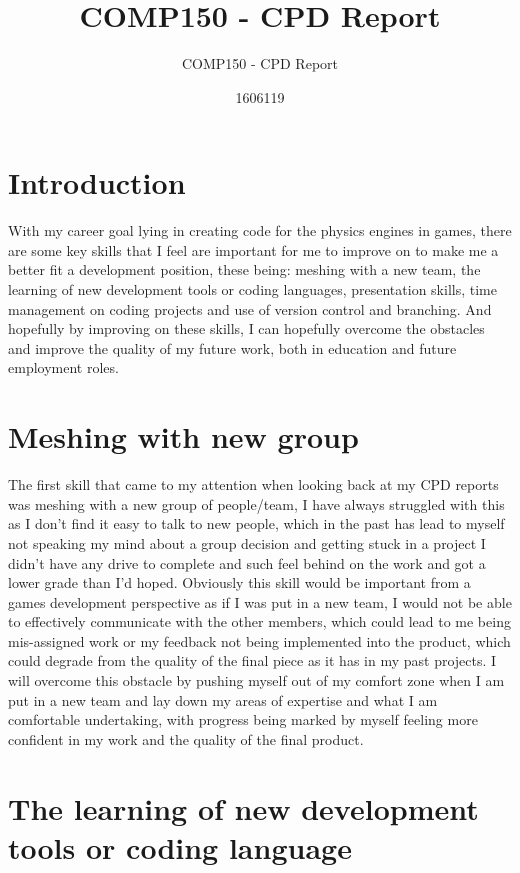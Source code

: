 \documentclass{scrartcl}
\title{COMP150 - CPD Report}
\subtitle{COMP150 - CPD Report}
\author{1606119}
\begin{document}
\maketitle

\section{Introduction}

With my career goal lying in creating code for the physics engines in games, there are some key skills that I feel are important for me to improve on to make me a better fit a development position, these being: meshing with a new team, the learning of new development tools or coding languages, presentation skills, time management on coding projects and use of version control and branching. And hopefully by improving on these skills, I can hopefully overcome the obstacles and improve the quality of my future work, both in education and future employment roles.

\section{Meshing with new group}

The first skill that came to my attention when looking back at my CPD reports was meshing with a new group of people/team, I have always struggled with this as I don't find it easy to talk to new people, which in the past has lead to myself not speaking my mind about a group decision and getting stuck in a project I didn't have any drive to complete and such feel behind on the work and got a lower grade than I'd hoped. Obviously this skill would be important from a games development perspective as if I was put in a new team, I would not be able to effectively communicate with the other members, which could lead to me being mis-assigned work or my feedback not being implemented into the product, which could degrade from the quality of the final piece as it has in my past projects. I will overcome this obstacle by pushing myself out of my comfort zone when I am put in a new team and lay down my areas of expertise and what I am comfortable undertaking, with progress being marked by myself feeling more confident in my work and the quality of the final product. 


\section{The learning of new development tools or coding language}
\end{document}
